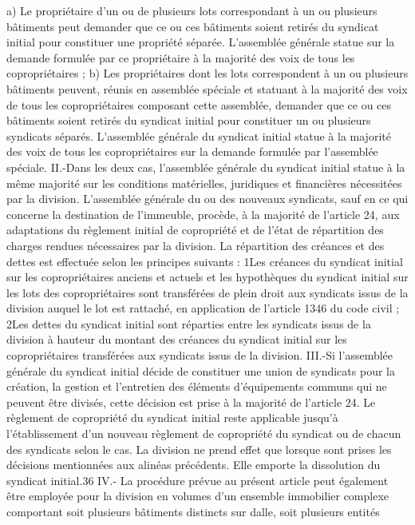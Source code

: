 \documentclass[11pt,a4paper]{report}
\begin{document}
	a) Le propriétaire d'un ou de plusieurs lots correspondant à un ou plusieurs bâtiments peut demander que ce ou
	ces bâtiments soient retirés du syndicat initial pour constituer une propriété séparée. L'assemblée générale
	statue sur la demande formulée par ce propriétaire à la majorité des voix de tous les copropriétaires ;
	b) Les propriétaires dont les lots correspondent à un ou plusieurs bâtiments peuvent, réunis en assemblée
	spéciale et statuant à la majorité des voix de tous les copropriétaires composant cette assemblée, demander que
	ce ou ces bâtiments soient retirés du syndicat initial pour constituer un ou plusieurs syndicats séparés.
	L'assemblée générale du syndicat initial statue à la majorité des voix de tous les copropriétaires sur la demande
	formulée par l'assemblée spéciale.
	II.-Dans les deux cas, l'assemblée générale du syndicat initial statue à la même majorité sur les conditions
	matérielles, juridiques et financières nécessitées par la division.
	L'assemblée générale du ou des nouveaux syndicats, sauf en ce qui concerne la destination de l'immeuble,
	procède, à la majorité de l'article 24, aux adaptations du règlement initial de copropriété et de l'état de
	répartition des charges rendues nécessaires par la division.
	La répartition des créances et des dettes est effectuée selon les principes suivants :
	1\degre  Les créances du syndicat initial sur les copropriétaires anciens et actuels et les hypothèques du syndicat
	initial sur les lots des copropriétaires sont transférées de plein droit aux syndicats issus de la division auquel le
	lot est rattaché, en application de l'article 1346 du code civil ;
	2\degre  Les dettes du syndicat initial sont réparties entre les syndicats issus de la division à hauteur du montant des
	créances du syndicat initial sur les copropriétaires transférées aux syndicats issus de la division.
	III.-Si l'assemblée générale du syndicat initial décide de constituer une union de syndicats pour la création, la
	gestion et l'entretien des éléments d'équipements communs qui ne peuvent être divisés, cette décision est prise à
	la majorité de l'article 24.
	Le règlement de copropriété du syndicat initial reste applicable jusqu'à l'établissement d'un nouveau règlement
	de copropriété du syndicat ou de chacun des syndicats selon le cas.
	La division ne prend effet que lorsque sont prises les décisions mentionnées aux alinéas précédents. Elle emporte
	la dissolution du syndicat initial.36
	IV.- La procédure prévue au présent article peut également être employée pour la division en volumes d'un
	ensemble immobilier complexe comportant soit plusieurs bâtiments distincts sur dalle, soit plusieurs entités
\end{document}
